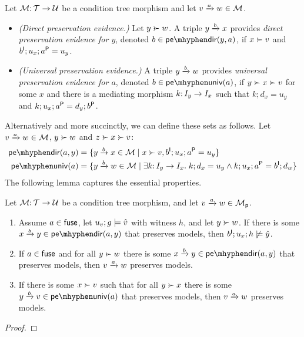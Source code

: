 \begin{definition}\label{def:preservation evidence}
Let $\cM\of \cT\to\cU$ be a condition tree morphism and let $\trip vaw\in\cM$.
\begin{itemize}[topsep=\smallskipamount]
\item \emph{(Direct preservation evidence.)} Let $y\childof w$. A triple $\trip ybx$ provides \emph{direct preservation evidence for $y$}, denoted $b\in\pedir{y,a}$, if $x\childof v$ and $b\I;u_x;a\P=u_y$.
\item \emph{(Universal preservation evidence.)} A triple $\trip ybw$ provides \emph{universal preservation evidence for $a$}, denoted $b\in\peuniv{a}$, if $y\childof x\childof v$ for some $x$ and there is a mediating morphism $k\of I_y\to I_x$ such that $k;d_x=u_y$ and $k;u_x;a\P=d_y;b\P$.
\end{itemize}
\end{definition}
%
Alternatively and more succinctly, we can define these sets as follows. Let $\trip vaw\in\cM$, $y\childof w$ and $z\childof x\childof v$:
%
\begin{align*}
\pedir{a,y} ={} & \gensetof{\trip ybx\in \cM}{x\childof v, b\I;u_x;a\P=u_y} \\
\peuniv{a} ={} & \gensetof{\trip ybw\in\cM}{\exists k\of I_y\to I_x\st k;d_x=u_y\wedge k;u_x;a\P=b\I;d_w}
\end{align*}
%
The following lemma captures the essential properties.
%
\begin{lemma}\label{lem:preservation evidence}
Let $\cM\of \cT\to \cU$ be a condition tree morphism, and let $\trip vaw\in \cM_\pgen$.
\begin{enumerate}[topsep=\itemsep]
\item Assume $a\in\fuse$, let $u_v;g\sat \hat v$ with witness $h$, and let $y\childof w$. If there is some $\trip xby\in \pedir{a,y}$ that preserves models, then $b\I;u_x;h\nsat \hat y$.
\item If $a\in \fuse$ and for all $y\childof w$ there is some $\trip xby\in \pedir{a,y}$ that preserves models, then $\trip vaw$ preserves models.
\item If there is some $x\childof v$ such that for all $y\childof x$ there is some $\trip ybv\in\peuniv{a}$ that preserves models, then $\trip vaw$ preserves models.
\end{enumerate}
\end{lemma}
%
\begin{proof}
\end{proof}
